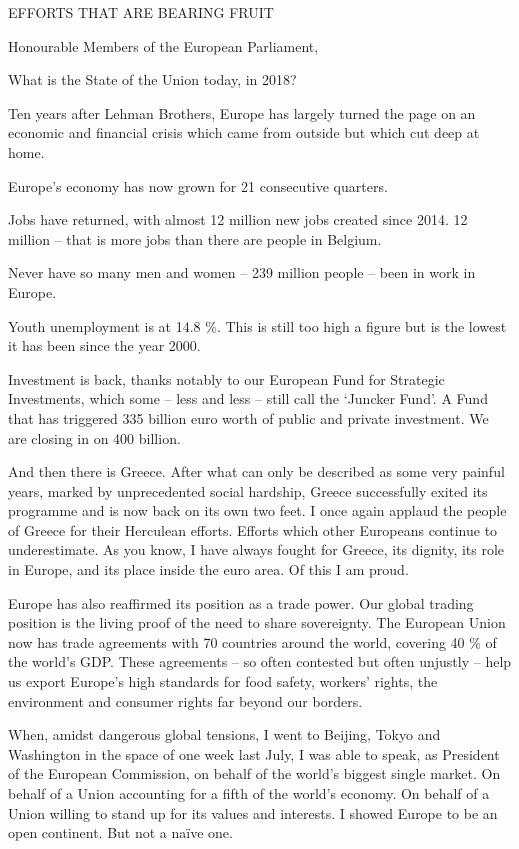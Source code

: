 \documentclass[a4paper,11pt]{article}
\begin{document}
EFFORTS THAT ARE BEARING FRUIT

Honourable Members of the European Parliament,

What is the State of the Union today, in 2018?

Ten years after Lehman Brothers, Europe has largely turned the page on an economic and financial crisis which came from outside but which cut deep at home.

Europe's economy has now grown for 21 consecutive quarters.

Jobs have returned, with almost 12 million new jobs created since 2014. 12 million – that is more jobs than there are people in Belgium.

Never have so many men and women – 239 million people – been in work in Europe.

Youth unemployment is at 14.8 \%. This is still too high a figure but is the lowest it has been since the year 2000.

Investment is back, thanks notably to our European Fund for Strategic Investments, which some – less and less – still call the ‘Juncker Fund'. A Fund that has triggered 335 billion euro worth of public and private investment. We are closing in on 400 billion.

And then there is Greece. After what can only be described as some very painful years, marked by unprecedented social hardship, Greece successfully exited its programme and is now back on its own two feet. I once again applaud the people of Greece for their Herculean efforts. Efforts which other Europeans continue to underestimate. As you know, I have always fought for Greece, its dignity, its role in Europe, and its place inside the euro area. Of this I am proud.

Europe has also reaffirmed its position as a trade power. Our global trading position is the living proof of the need to share sovereignty. The European Union now has trade agreements with 70 countries around the world, covering 40 \% of the world's GDP. These agreements – so often contested but often unjustly – help us export Europe's high standards for food safety, workers' rights, the environment and consumer rights far beyond our borders.

When, amidst dangerous global tensions, I went to Beijing, Tokyo and Washington in the space of one week last July, I was able to speak, as President of the European Commission, on behalf of the world's biggest single market. On behalf of a Union accounting for a fifth of the world's economy. On behalf of a Union willing to stand up for its values and interests. I showed Europe to be an open continent. But not a naïve one.
\end{document}
